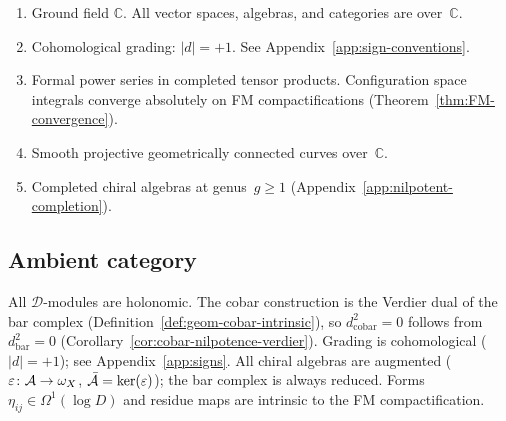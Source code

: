 \begin{convention}
\label{conv:standing-assumptions}
\begin{enumerate}[label=\textup{(SA\arabic*)}]
\item\label{SA:ground-field} Ground field $\mathbb{C}$.  All
  vector spaces, algebras, and categories are
  over~$\mathbb{C}$.
\item\label{SA:grading} Cohomological grading: $|d| = +1$.
  See Appendix~\ref{app:sign-conventions}.
\item\label{SA:convergence} Formal power series in completed
  tensor products.  Configuration space integrals converge
  absolutely on FM compactifications
  (Theorem~\ref{thm:FM-convergence}).
\item\label{SA:curves} Smooth projective geometrically connected
  curves over~$\mathbb{C}$.
\item\label{SA:completion} Completed chiral algebras at
  genus~$g \geq 1$
  (Appendix~\ref{app:nilpotent-completion}).
\end{enumerate}
\end{convention}

\subsection{Ambient category}
\label{subsec:ambient-category}

All $\mathcal{D}$-modules are holonomic.  The cobar
construction is the Verdier dual of the bar complex
(Definition~\ref{def:geom-cobar-intrinsic}), so
$d_{\mathrm{cobar}}^2 = 0$ follows from $d_{\mathrm{bar}}^2 = 0$
(Corollary~\ref{cor:cobar-nilpotence-verdier}).
Grading is cohomological ($|d| = +1$); see
Appendix~\ref{app:signs}.
All chiral algebras are augmented
($\varepsilon\colon \mathcal{A} \to \omega_X$,
$\bar{\mathcal{A}} = \ker(\varepsilon)$);
the bar complex is always reduced.
Forms $\eta_{ij} \in \Omega^1(\log D)$ and residue maps are
intrinsic to the FM compactification.
